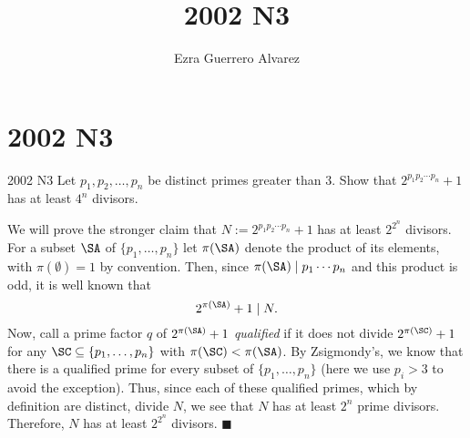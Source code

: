 \documentclass[14pt]{article}
\title{2002 N3}
\author{Ezra Guerrero Alvarez}
\begin{document}
\maketitle
	
\section*{2002 N3}

\begin{statement}{2002 N3}
	Let $p_1,p_2,\ldots,p_n$ be distinct primes greater than $3$. Show that $2^{p_1p_2\cdots p_n}+1$ has at least $4^n$ divisors.
\end{statement}
We will prove the stronger claim that $N:=2^{p_1p_2\cdots p_n}+1$ has at least $2^{2^n}$ divisors. \\
For a subset $\SA$ of $\{p_1,\ldots,p_n\}$ let $\pi(\SA)$ denote the product of its elements, with $\pi(\emptyset)=1$ by convention. Then, since $\pi(\SA)\mid p_1\cdots p_n$ and this product is odd, it is well known that
\[ 2^{\pi(\SA)}+1\mid N. \]
Now, call a prime factor $q$ of $2^{\pi(\SA)}+1$ \emph{qualified} if it does not divide $2^{\pi(\SC)}+1$ for any $\SC\subseteq\{p_1,\ldots,p_n\}$ with $\pi(\SC)<\pi(\SA)$. By Zsigmondy's, we know that there is a qualified prime for every subset of $\{p_1,\ldots,p_n\}$ (here we use $p_i>3$ to avoid the exception). Thus, since each of these qualified primes, which by definition are distinct, divide $N$, we see that $N$ has at least $2^n$ prime divisors. Therefore, $N$ has at least $2^{2^n}$ divisors. $\blacksquare$
	
\end{document}
